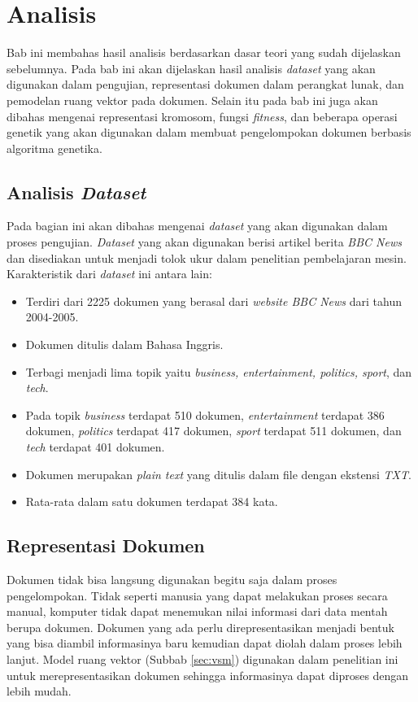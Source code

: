 \chapter{Analisis}
\label{chap:analisis}

Bab ini membahas hasil analisis berdasarkan dasar teori yang sudah dijelaskan sebelumnya. Pada bab ini akan dijelaskan hasil analisis \textit{dataset} yang akan digunakan dalam pengujian, representasi dokumen dalam perangkat lunak, dan pemodelan ruang vektor pada dokumen. Selain itu pada bab ini juga akan dibahas mengenai representasi kromosom, fungsi \textit{fitness}, dan beberapa operasi genetik yang akan digunakan dalam membuat pengelompokan dokumen berbasis algoritma genetika.

\section{Analisis \textit{Dataset}}
\label{sec:dataset}
Pada bagian ini akan dibahas mengenai \textit{dataset} yang akan digunakan dalam proses pengujian. \textit{Dataset} yang akan digunakan berisi artikel berita \textit{BBC News} dan disediakan untuk menjadi tolok ukur dalam penelitian pembelajaran mesin. Karakteristik dari \textit{dataset} ini antara lain:

\begin{itemize}
	\item Terdiri dari 2225 dokumen yang berasal dari \textit{website BBC News} dari tahun 2004-2005.
	\item Dokumen ditulis dalam Bahasa Inggris.
	\item Terbagi menjadi lima topik yaitu \textit{business, entertainment, politics, sport}, dan \textit{tech}.
	\item Pada topik \textit{business} terdapat 510 dokumen, \textit{entertainment} terdapat 386 dokumen, \textit{politics} terdapat 417 dokumen, \textit{sport} terdapat 511 dokumen, dan \textit{tech} terdapat 401 dokumen.
	\item Dokumen merupakan \textit{plain text} yang ditulis dalam file dengan ekstensi \textit{TXT}.
	\item Rata-rata dalam satu dokumen terdapat 384 kata.
\end{itemize}

\section{Representasi Dokumen}
Dokumen tidak bisa langsung digunakan begitu saja dalam proses pengelompokan. Tidak seperti manusia yang dapat melakukan proses secara manual, komputer tidak dapat menemukan nilai informasi dari data mentah berupa dokumen. Dokumen yang ada perlu direpresentasikan menjadi bentuk yang bisa diambil informasinya baru kemudian dapat diolah dalam proses lebih lanjut. Model ruang vektor (Subbab \ref{sec:vsm}) digunakan dalam penelitian ini untuk merepresentasikan dokumen sehingga informasinya dapat diproses dengan lebih mudah.

